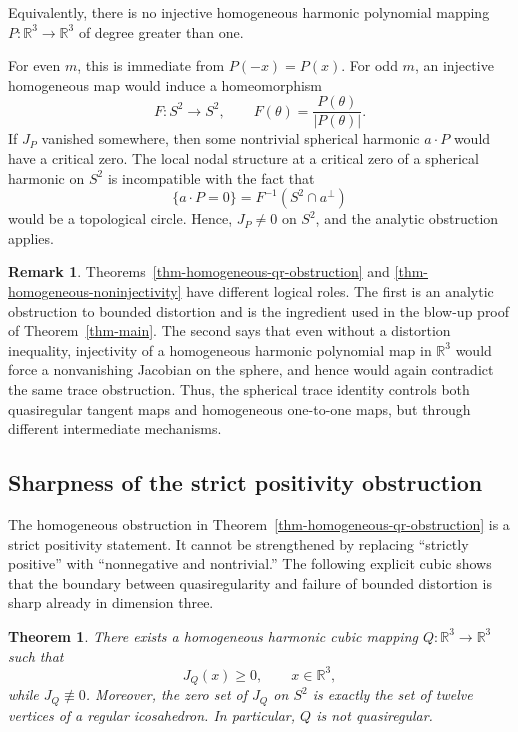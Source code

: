 \documentclass[10pt]{amsart}
\numberwithin{equation}{section}
\newtheorem{theorem}{Theorem}[section]
\theoremstyle{definition}
\newtheorem{remark}{Remark}[section]
\newcommand{\R}{\mathbb R}
\begin{document}
Equivalently, there is no injective homogeneous harmonic polynomial mapping
\(P:\R^3\to\R^3\) of degree greater than one.

For even \(m\), this is immediate from \(P(-x)=P(x)\). For odd \(m\), an
injective homogeneous map would induce a homeomorphism
\[
        F:S^2\to S^2,
        \qquad
        F(\theta)=\frac{P(\theta)}{|P(\theta)|}.
\]
If \(J_P\) vanished somewhere, then some nontrivial spherical harmonic
\(a\cdot P\) would have a critical zero. The local nodal structure at a
critical zero of a spherical harmonic on \(S^2\) is incompatible with the fact
that
\[
        \{a\cdot P=0\}=F^{-1}(S^2\cap a^\perp)
\]
would be a topological circle. Hence, \(J_P\ne0\) on \(S^2\), and the analytic
obstruction applies.

\begin{remark}
Theorems~\ref{thm-homogeneous-qr-obstruction} and
\ref{thm-homogeneous-noninjectivity} have different logical roles. The first is
an analytic obstruction to bounded distortion and is the ingredient used in the
blow-up proof of Theorem~\ref{thm-main}. The second says that even without a
distortion inequality, injectivity of a homogeneous harmonic polynomial map in
\(\R^3\) would force a nonvanishing Jacobian on the sphere, and hence would
again contradict the same trace obstruction. Thus, the spherical trace identity
controls both quasiregular tangent maps and homogeneous one-to-one maps, but
through different intermediate mechanisms.
\end{remark}

\subsection{Sharpness of the strict positivity obstruction}

The homogeneous obstruction in Theorem~\ref{thm-homogeneous-qr-obstruction}
is a strict positivity statement. It cannot be strengthened by replacing
``strictly positive'' with ``nonnegative and nontrivial.'' The following
explicit cubic shows that the boundary between quasiregularity and failure of
bounded distortion is sharp already in dimension three.

\begin{theorem}
\label{thm-icosahedral-borderline}
There exists a homogeneous harmonic cubic mapping
\(Q:\R^3\to\R^3\) such that
\[
        J_Q(x)\ge0,\qquad x\in\R^3,
\]
while \(J_Q\not\equiv0\). Moreover, the zero set of \(J_Q\) on \(S^2\) is
exactly the set of twelve vertices of a regular icosahedron. In particular,
\(Q\) is not quasiregular.
\end{theorem}
\end{document}
